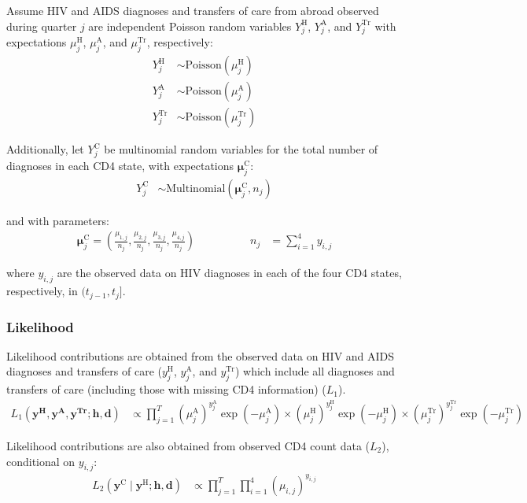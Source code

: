 \documentclass[11pt, a4paper]{article}
\begin{document}
Assume HIV and AIDS diagnoses and transfers of care from abroad observed during quarter $j$ are independent Poisson random variables $Y^\text{H}_j$, $Y^\text{A}_j$, and $Y^\text{Tr}_j$ with expectations $\mu_j^\text{H}$, $\mu_j^\text{A}$, and $\mu_j^\text{Tr}$, respectively:
%
\begin{align*}
  Y^\text{H}_j & \sim \text{Poisson}(\mu_j^\text{H}) \\
  Y^\text{A}_j & \sim \text{Poisson}(\mu_j^\text{A}) \\
  Y^\text{Tr}_j & \sim \text{Poisson}(\mu_j^\text{Tr})
\end{align*}

Additionally, let $Y^\text{C}_{j}$ be multinomial random variables for the total number of diagnoses in each CD4 state, with expectations $\bm{\mu}_{j}^\text{C}$:
%
\begin{align*}
  Y^\text{C}_{j} & \sim \text {Multinomial}(\bm{\mu}_j^\text{C},n_j)
\end{align*}

and with parameters:
%
\begin{align*}
  \bm{\mu}^\text{C}_j =\left(\frac{\mu_{1,j}}{n_j},\frac{\mu_{2,j}}{n_j},\frac{\mu_{3,j}}{n_j},\frac{\mu_{4,j}}{n_j}\right) \quad \quad \quad \quad \quad
  n_j & = \sum_{i=1}^4{y_{i,j}}
\end{align*}

where $y_{i,j}$ are the observed data on HIV diagnoses in each of the four CD4 states, respectively, in $(t_{j-1},t_j]$.

\subsubsection{Likelihood}

Likelihood contributions are obtained from the observed data on HIV and AIDS diagnoses and transfers of care ($y_j^\text{H}$, $y_j^\text{A}$, and $y_j^\text{Tr}$) which include all diagnoses and transfers of care (including those with missing CD4 information) ($L_1$).
%
\begin{align*}
  L_1(\bm{y^\text{H}}, \bm{y^\text{A}}, \bm{y^\text{Tr}};\bm{h},\bm{d})                      & \propto \prod_{j=1}^T {(\mu_j^\text{A})}^{y^\text{A}_j}\exp(-\mu_j^\text{A}) \times {(\mu_j^\text{H})}^{y^\text{H}_j}\exp(-\mu_j^\text{H}) \times {(\mu_j^\text{Tr})}^{y^\text{Tr}_j}\exp(-\mu_j^\text{Tr})
\end{align*}

Likelihood contributions are also obtained from observed CD4 count data ($L_2$), conditional on $y_{i,j}$\@:
%
\begin{align*}
  L_2(\bm{y}^\text{C} \mid \bm{y}^\text{H};\bm{h},\bm{d}) & \propto \prod_{j=1}^T \prod_{i=1}^4 {(\mu_{i,j})}^{y_{i,j}} 
\end{align*}
\end{document}
